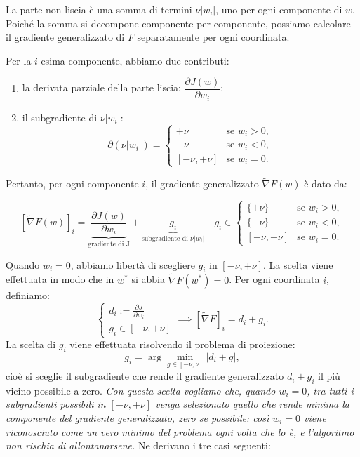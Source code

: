 \documentclass[a4paper,12pt]{article}
\numberwithin{equation}{section}
\numberwithin{figure}{section}
\numberwithin{table}{section}
\begin{document}
La parte non liscia è una somma di termini $\nu |w_i|$, uno per ogni componente
di $w$. Poiché la somma si decompone componente per componente, possiamo
calcolare il gradiente generalizzato di $F$ separatamente per ogni coordinata.

Per la $i$-esima componente, abbiamo due contributi:

\begin{enumerate}
    \item la derivata parziale della parte liscia: $\dfrac{\partial J(w)}{\partial w_i}$;
    \item il subgradiente di $\nu |w_i|$:
    \[
    \partial (\nu |w_i|) =
    \begin{cases}
    +\nu & \text{se } w_i > 0, \\
    -\nu & \text{se } w_i < 0, \\
    [-\nu, +\nu] & \text{se } w_i = 0.
    \end{cases}
    \]
    \end{enumerate}

Pertanto, per ogni componente $i$, il gradiente generalizzato $\widetilde{\nabla} F(w)$
è dato da:

\[
[\widetilde{\nabla} F(w)]_i =
\underbrace{\frac{\partial J(w)}{\partial w_i}}_{\text{gradiente di J}}
+
\underbrace{g_i}_{\text{subgradiente di }\nu |w_i|} \quad
g_i \in
\begin{cases}
\{+\nu\} & \text{se } w_i > 0, \\
\{-\nu\} & \text{se } w_i < 0, \\
[-\nu, +\nu] & \text{se } w_i = 0.
\end{cases}
\]

Quando $w_i = 0$, abbiamo libertà di scegliere $g_i$ in $[-\nu, +\nu]$.
La scelta viene effettuata in modo che in $w^*$ si abbia $\widetilde{\nabla}F(w^*) = 0$.
Per ogni coordinata \(i\), definiamo:
\[
\begin{cases}d_i := \frac{\partial J}{\partial w_i} \\
g_i \in [-\nu, +\nu]\end{cases}\implies 
[\widetilde{\nabla}F]_i = d_i + g_i.
\]
La scelta di \(g_i\) viene effettuata risolvendo il problema di proiezione:
\[
g_i = \arg\min_{g \in [-\nu, \nu]} |d_i + g|,
\]
cioè si sceglie il subgradiente che rende il gradiente generalizzato \(d_i + g_i\) il più vicino possibile a zero. \textit{Con questa scelta vogliamo che, quando $w_i=0$, tra tutti i subgradienti possibili in $[-\nu,+\nu]$ venga selezionato quello che rende minima la componente del gradiente generalizzato, zero se possibile: così $w_i=0$ viene riconosciuto come un vero minimo del problema ogni volta che lo è, e l'algoritmo non rischia di allontanarsene.} Ne derivano i tre casi seguenti:
\end{document}
